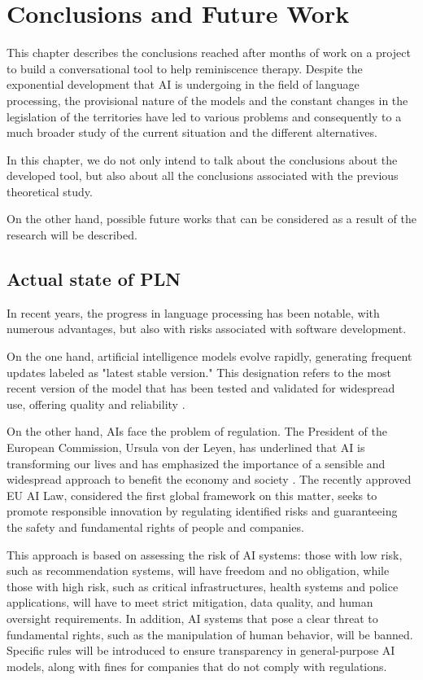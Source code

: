 \chapter*{Conclusions and Future Work}
\label{cap:conclusions}
This chapter describes the conclusions reached after months of work on a project to build a conversational tool to help reminiscence therapy. Despite the exponential development that AI is undergoing in the field of language processing, the provisional nature of the models and the constant changes in the legislation of the territories have led to various problems and consequently to a much broader study of the current situation and the different alternatives.

In this chapter, we do not only intend to talk about the conclusions about the developed tool, but also about all the conclusions associated with the previous theoretical study.

On the other hand, possible future works that can be considered as a result of the research will be described.

\section{Actual state of PLN}
In recent years, the progress in language processing has been notable, with numerous advantages, but also with risks associated with software development.

On the one hand, artificial intelligence models evolve rapidly, generating frequent updates labeled as "latest stable version." This designation refers to the most recent version of the model that has been tested and validated for widespread use, offering quality and reliability \cite{generative-ai-terms}.

On the other hand, AIs face the problem of regulation. The President of the European Commission, Ursula von der Leyen, has underlined that AI is transforming our lives and has emphasized the importance of a sensible and widespread approach to benefit the economy and society \cite{ComisionEuropea-ComunicadoPrensa-LeyIA}. The recently approved EU AI Law, considered the first global framework on this matter, seeks to promote responsible innovation by regulating identified risks and guaranteeing the safety and fundamental rights of people and companies.

This approach is based on assessing the risk of AI systems: those with low risk, such as recommendation systems, will have freedom and no obligation, while those with high risk, such as critical infrastructures, health systems and police applications, will have to meet strict mitigation, data quality, and human oversight requirements. In addition, AI systems that pose a clear threat to fundamental rights, such as the manipulation of human behavior, will be banned. Specific rules will be introduced to ensure transparency in general-purpose AI models, along with fines for companies that do not comply with regulations.


